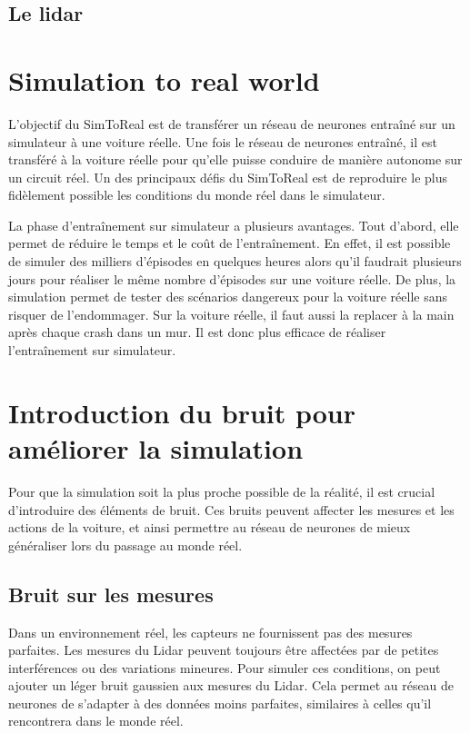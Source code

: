 \documentclass[french]{article}
\begin{document}
\subsection{Le lidar}


\section{Simulation to real world}
L'objectif du SimToReal est de transférer un réseau de neurones entraîné sur un simulateur à une voiture réelle. 
Une fois le réseau de neurones entraîné, il est transféré à la voiture réelle pour qu'elle puisse conduire de manière 
autonome sur un circuit réel. Un des principaux défis du SimToReal est de reproduire le plus fidèlement possible les 
conditions du monde réel dans le simulateur.

\vspace{0.5cm}
La phase d'entraînement sur simulateur a plusieurs avantages. Tout d'abord, elle permet de réduire le temps et le coût
de l'entraînement. En effet, il est possible de simuler des milliers d'épisodes en quelques heures 
alors qu'il faudrait plusieurs jours pour réaliser le même nombre d'épisodes sur une voiture réelle. De plus,
la simulation permet de tester des scénarios dangereux pour la voiture réelle sans risquer de l'endommager.
Sur la voiture réelle, il faut aussi la replacer à la main après chaque crash dans un mur. Il est donc plus
efficace de réaliser l'entraînement sur simulateur.

\section{Introduction du bruit pour améliorer la simulation}
Pour que la simulation soit la plus proche possible de la réalité, il est crucial d'introduire des éléments de bruit. 
Ces bruits peuvent affecter les mesures et les actions de la voiture, et ainsi permettre au réseau de neurones de 
mieux généraliser lors du passage au monde réel.


\subsection{Bruit sur les mesures}
Dans un environnement réel, les capteurs ne fournissent pas des mesures parfaites. Les mesures du Lidar peuvent 
toujours être affectées par de petites interférences ou des variations mineures. Pour simuler ces conditions, 
on peut ajouter un léger bruit gaussien aux mesures du Lidar. Cela permet au réseau de neurones de s'adapter 
à des données moins parfaites, similaires à celles qu'il rencontrera dans le monde réel.
\end{document}
